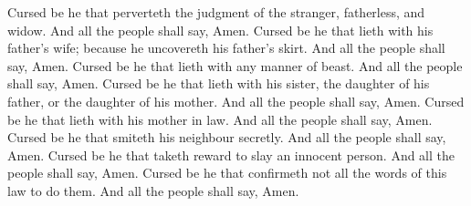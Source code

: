 \begin{biblechapter}
\verse Cursed be he that perverteth the judgment of the stranger, fatherless, and widow. And all the people shall say, Amen.
\verse Cursed be he that lieth with his father's wife; because he uncovereth his father's skirt. And all the people shall say, Amen.
\verse Cursed be he that lieth with any manner of beast. And all the people shall say, Amen.
\verse Cursed be he that lieth with his sister, the daughter of his father, or the daughter of his mother. And all the people shall say, Amen.
\verse Cursed be he that lieth with his mother in law. And all the people shall say, Amen.
\verse Cursed be he that smiteth his neighbour secretly. And all the people shall say, Amen.
\verse Cursed be he that taketh reward to slay an innocent person. And all the people shall say, Amen.
\verse Cursed be he that confirmeth not all the words of this law to do them. And all the people shall say, Amen.
\end{biblechapter}

